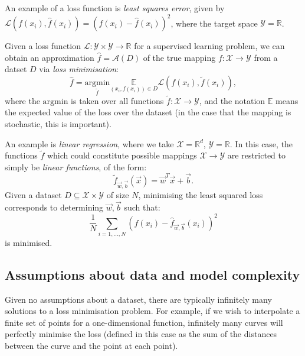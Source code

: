 \begin{frameex}
An example of a loss function is \textit{least squares error}, given by $\mathcal{L}(f(x_i),\hat{f}(x_i)) = (f(x_i) - \hat{f}(x_i))^2$, where the target space $\mathcal{Y} = \mathbb{R}$.
\end{frameex}

\begin{framedef}
Given a loss function $\mathcal{L} : \mathcal{Y} \times \mathcal{Y} \rightarrow \mathbb{R}$ for a supervised learning problem, we can obtain an approximation $\hat{f} = \mathcal{A}(D)$ of the true mapping $f : \mathcal{X} \rightarrow \mathcal{Y}$ from a datset $D$ via \textit{loss minimisation}:
\begin{equation*}
\hat{f} = \underset{\tilde{f}}{\textrm{argmin}} \underset{(x_i,f(x_i)) \in D}{\mathbb{E}} \mathcal{L}(f(x_i), \tilde{f}(x_i)),
\end{equation*}
where the $\textrm{argmin}$ is taken over all functions $\tilde{f} : \mathcal{X} \rightarrow \mathcal{Y}$, and the notation $\mathbb{E}$ means the expected value of the loss over the dataset (in the case that the mapping is stochastic, this is important).
\end{framedef}



\newpage
\begin{frameex}
An example is \textit{linear regression}, where we take $\mathcal{X} = \mathbb{R}^d$, $\mathcal{Y} = \mathbb{R}$. In this case, the functions $\tilde{f}$ which could constitute possible mappings $\mathcal{X} \rightarrow \mathcal{Y}$ are restricted to simply be \textit{linear functions}, of the form:
\begin{equation*}
\tilde{f}_{\vec{w},\vec{b}}(\vec{x}) = \vec{w}^T \vec{x} + \vec{b}.
\end{equation*}
Given a dataset $D \subseteq \mathcal{X} \times \mathcal{Y}$ of size $N$, minimising the least squared loss corresponds to determining $\vec{w}, \vec{b}$ such that:
\begin{equation*}
\frac{1}{N}\sum_{i=1,...,N} \left( f(x_i) - \hat{f}_{\vec{w},\vec{b}}(x_i) \right)^2
\end{equation*}
is minimised.
\end{frameex}


\newpage
\subsection{Assumptions about data and model complexity}
Given no assumptions about a dataset, there are typically infinitely many solutions to a loss minimisation problem. For example, if we wish to interpolate a finite set of points for a one-dimensional function, infinitely many curves will perfectly minimise the loss (defined in this case as the sum of the distances between the curve and the point at each point).\\

